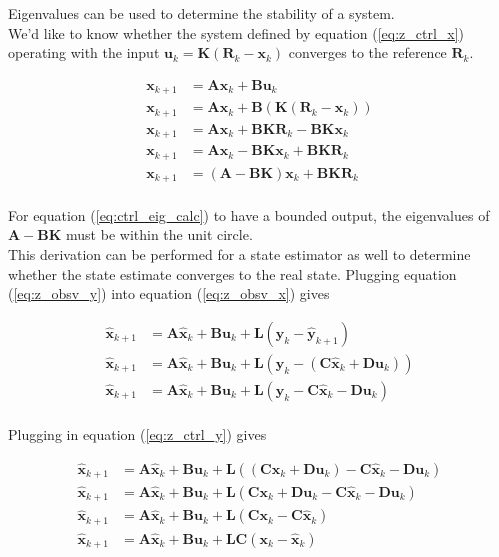 \documentclass[10pt,conference,compsoc]{IEEEtran}
\newcommand{\mtx}[1] {\bm #1}
\begin{document}
\noindent Eigenvalues can be used to determine the stability of a \gls{system}.
\\

\noindent We'd like to know whether the \gls{system} defined by equation
(\ref{eq:z_ctrl_x}) operating with the input
$\mtx{u}_k = \mtx{K}(\mtx{R}_k - \mtx{x}_k)$ converges to the \gls{reference}
$\mtx{R}_k$.

\begin{align}
  \mtx{x}_{k+1} &= \mtx{A}\mtx{x}_k + \mtx{B}\mtx{u}_k \nonumber \\
  \mtx{x}_{k+1} &= \mtx{A}\mtx{x}_k + \mtx{B}(\mtx{K}(\mtx{R}_k - \mtx{x}_k))
    \nonumber \\
  \mtx{x}_{k+1} &= \mtx{A}\mtx{x}_k + \mtx{B}\mtx{K}\mtx{R}_k -
    \mtx{B}\mtx{K}\mtx{x}_k \nonumber \\
  \mtx{x}_{k+1} &= \mtx{A}\mtx{x}_k - \mtx{B}\mtx{K}\mtx{x}_k +
    \mtx{B}\mtx{K}\mtx{R}_k \nonumber \\
  \mtx{x}_{k+1} &= (\mtx{A} - \mtx{B}\mtx{K})\mtx{x}_k +
    \mtx{B}\mtx{K}\mtx{R}_k \label{eq:ctrl_eig_calc}
\end{align}
\\
\noindent For equation (\ref{eq:ctrl_eig_calc}) to have a bounded output, the
eigenvalues of $\mtx{A} - \mtx{B}\mtx{K}$ must be within the unit circle. \\

\noindent This derivation can be performed for a \gls{state} estimator as well
to determine whether the \gls{state} estimate converges to the real \gls{state}.
Plugging equation (\ref{eq:z_obsv_y}) into equation (\ref{eq:z_obsv_x}) gives

\begin{align*}
  \hat{\mtx{x}}_{k+1} &= \mtx{A}\hat{\mtx{x}}_k + \mtx{B}\mtx{u}_k +
    \mtx{L} (\mtx{y}_k - \hat{\mtx{y}}_{k+1}) \\
  \hat{\mtx{x}}_{k+1} &= \mtx{A}\hat{\mtx{x}}_k + \mtx{B}\mtx{u}_k +
    \mtx{L} (\mtx{y}_k - (\mtx{C}\hat{\mtx{x}}_k + \mtx{D}\mtx{u}_k)) \\
  \hat{\mtx{x}}_{k+1} &= \mtx{A}\hat{\mtx{x}}_k + \mtx{B}\mtx{u}_k +
    \mtx{L} (\mtx{y}_k - \mtx{C}\hat{\mtx{x}}_k - \mtx{D}\mtx{u}_k) \\
\end{align*}

\noindent Plugging in equation (\ref{eq:z_ctrl_y}) gives

\begin{align*}
  \hat{\mtx{x}}_{k+1} &= \mtx{A}\hat{\mtx{x}}_k + \mtx{B}\mtx{u}_k +
    \mtx{L}((\mtx{C}\mtx{x}_k + \mtx{D}\mtx{u}_k) - \mtx{C}\hat{\mtx{x}}_k -
    \mtx{D}\mtx{u}_k) \\
  \hat{\mtx{x}}_{k+1} &= \mtx{A}\hat{\mtx{x}}_k + \mtx{B}\mtx{u}_k +
    \mtx{L}(\mtx{C}\mtx{x}_k + \mtx{D}\mtx{u}_k - \mtx{C}\hat{\mtx{x}}_k -
    \mtx{D}\mtx{u}_k) \\
  \hat{\mtx{x}}_{k+1} &= \mtx{A}\hat{\mtx{x}}_k + \mtx{B}\mtx{u}_k +
    \mtx{L}(\mtx{C}\mtx{x}_k - \mtx{C}\hat{\mtx{x}}_k) \\
  \hat{\mtx{x}}_{k+1} &= \mtx{A}\hat{\mtx{x}}_k + \mtx{B}\mtx{u}_k +
    \mtx{L}\mtx{C}(\mtx{x}_k - \hat{\mtx{x}}_k) \\
\end{align*}
\end{document}
